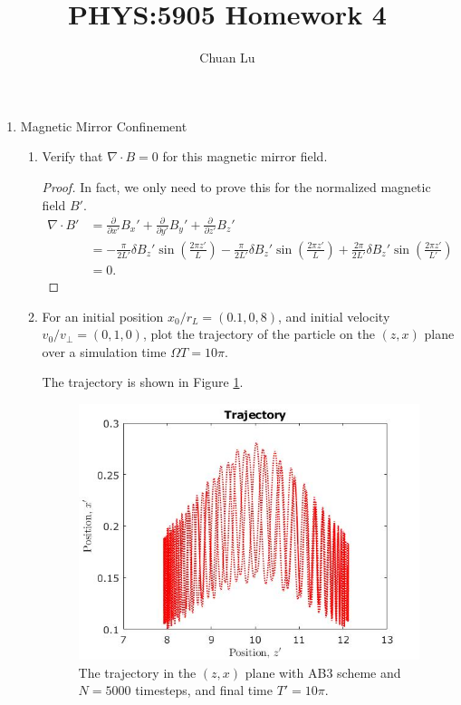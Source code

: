 \documentclass{article}
\begin{document}
\author{Chuan Lu}
\title{PHYS:5905 Homework 4}
\maketitle

\medskip

\begin{enumerate}
\item
Magnetic Mirror Confinement

\begin{enumerate}
\item Verify that $\nabla\cdot B = 0$ for this magnetic mirror field.

\begin{proof}
In fact, we only need to prove this for the normalized magnetic field $B'$.
$$
\begin{aligned}
\nabla\cdot B' &= \frac{\partial}{\partial x'}B_x'+ \frac{\partial }{\partial y'}B_y' + \frac{\partial }{\partial z'} B_z' \\
&= -\frac{\pi}{2L'}\delta B_z'\sin(\frac{2\pi z'}{L}) -\frac{\pi}{2L'}\delta B_z'\sin(\frac{2\pi z'}{L}) + \frac{2\pi}{2L'}\delta B_z'\sin(\frac{2\pi z'}{L'}) \\
&= 0.
\end{aligned}
$$
\end{proof}

\item 
For an initial position $x_0/r_L = (0.1, 0, 8)$, and initial velocity $v_0/v_\perp = (0, 1, 0)$, plot the trajectory of the particle on the $(z, x)$ plane over a simulation time $\Omega T = 10\pi$.

The trajectory is shown in Figure \ref{problem 1.1}.
\begin{figure}[h]
\centering
\vbox{
\includegraphics[scale=0.4]{problem4a/trajectory_zx_5000.jpg}
}
\caption{The trajectory in the $(z, x)$ plane with AB3 scheme and $N=5000$ timesteps, and final time $T' = 10\pi$.}
\label{problem 1.1}
\end{figure}


\end{enumerate}
\end{enumerate}
\end{document}
